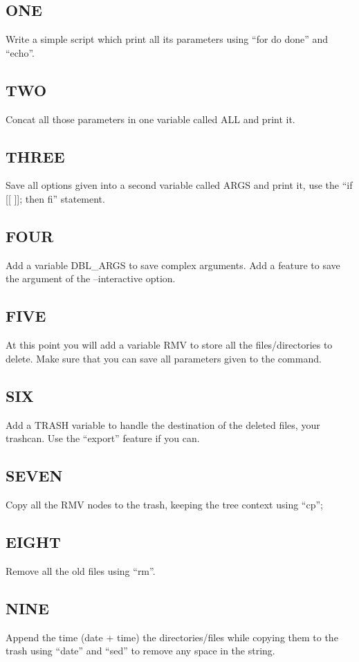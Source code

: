 \subsection{ONE}
Write a simple script which print all its parameters using ``for do done'' and ``echo''.

\subsection{TWO}
Concat all those parameters in one variable called ALL and print it.

\subsection{THREE}
Save all options given into a second variable called ARGS and print it, use the ``if [[ ]]; then fi'' statement.

\subsection{FOUR}
Add a variable DBL\_ARGS  to save complex arguments.
Add a feature to save the argument of the --interactive option.

\subsection{FIVE}
At this point you will add a variable RMV to store all the files/directories to delete.
Make sure that you can save all parameters given to the command.

\subsection{SIX}
Add a TRASH variable to handle the destination of the deleted files, your trashcan.
Use the ``export'' feature if you can.

\subsection{SEVEN}
Copy all the RMV nodes to the trash, keeping the tree context using ``cp'';

\subsection{EIGHT}
Remove all the old files using ``rm''.

\subsection{NINE}
Append the time (date + time) the directories/files while copying them to the trash using ``date'' and ``sed'' to remove any space in the string.

